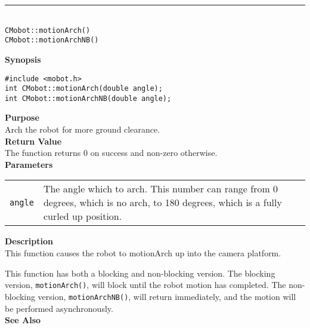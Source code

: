 \noindent
\vspace{5pt}
\rule{4.5in}{0.015in}\\
\noindent
{\LARGE \texttt{CMobot::motionArch()}}\\
{\LARGE \texttt{CMobot::motionArchNB()}}\\
{}

\noindent
{\bf Synopsis}
\vspace{-8pt}
\begin{verbatim}
#include <mobot.h>
int CMobot::motionArch(double angle);
int CMobot::motionArchNB(double angle);
\end{verbatim}

\noindent
{\bf Purpose}\\
Arch the robot for more ground clearance.\\

\noindent
{\bf Return Value}\\
The function returns 0 on success and non-zero otherwise.\\

\noindent
{\bf Parameters}\\
\vspace{-0.1in}
\begin{description}
\item               
\begin{tabular}{p{10 mm}p{145 mm}}
\texttt{angle} & The angle which to arch. This number can range from 0 degrees, which is
no arch, to 180 degrees, which is a fully curled up position.\\
\end{tabular}
\end{description}

\noindent
{\bf Description}\\
This function causes the robot to motionArch up into the camera platform.

This function has both a blocking and non-blocking version.
The blocking version, \texttt{motionArch()}, will block until the
robot motion has completed. The non-blocking version, \texttt{motionArchNB()},
will return immediately, and the motion will be performed asynchronously.\\

\noindent
{\bf See Also}\\

